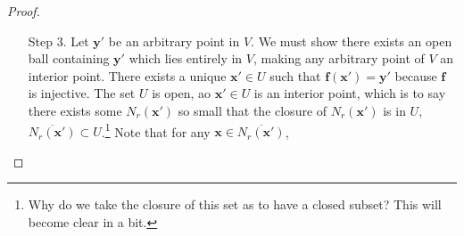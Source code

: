 \documentclass{article}
\newcommand{\R}{\mathbb{R}}
\newcommand{\x}{\mathbf{x}}
\newcommand{\f}{\mathbf{f}}
\newcommand{\y}{\mathbf{y}}
\newcommand{\norm}[1]{\left\lVert#1\right\rVert}
\newcommand{\normop}[1]{\left\lVert#1\right\rVert_\text{op}}
\theoremstyle{definition}
\begin{document}
\begin{proof}
\begin{enumerate}
\begin{align}
	\varphi_\y'(\x) &= I -  [\f'(\x_0)]^{-1} \f(\x)\nonumber\\ 
	& =  [\f'(\x_0)]^{-1}\f'(\x_0) -  [\f'(\x_0)]^{-1} \f(\x)\nonumber\\ 
	& = [\f'(\x_0)]^{-1}\left[\f'(\x_0) - \f(\x)\right].
\end{align}
If we combine this with (51), we have 
\begin{align*}
	\normop{\varphi_\y'(\x)} & = \normop{[\f'(\x_0)]^{-1}\left[\f'(\x_0) - \f(\x)\right]} \\
	& \le \normop{[\f'(\x_0)]^{-1}}\normop{\f'(\x_0) - \f(\x)}& (\text{Lemma 8.2})\\ & 
	< \normop{[\f'(\x_0)]^{-1}}\frac{\normop{[\f'(\x_0)]^{-1}}^{-1}}{2} & (\text{Equation (51)})\\
	& = \frac{1}{2}
\end{align*}
for all $ \x \in U $.\footnote{For all $ \x\in U $, as these are the set of $ \x $ for which $ \norm{\x-\x_0}_{\R^n} < \delta $ and (51) holds.} If we apply Theorem 9.5 to $ \varphi_\y(\x) $ and the bound $ 	\normop{\varphi_\y'(\x)} < \frac{1}{2} $, we have 
\begin{equation}\label{key}
	\norm{\varphi_\y(\x) - \varphi_\y(\x')} \le \frac{1}{2}\norm{\x-\x'}_{\R^n} 
\end{equation}
 for all $ \x,\x'\in U $. This makes $ \varphi_\y(\x) $ a contraction.\footnote{But we cannot use the Banach fixed point theorem yet. We don't know the range of $ \varphi_\y(\x) $.} This does however show that $ \varphi_\y $ has \textit{at most} on fixed point in $ U $.\footnote{Actually, any contraction has at most one fixed point.} For the sake of contradiction, suppose $ \varphi_\y(\x)=\x $ and $ \varphi_\y(\x')=\x'  $. This would contradict (54): 
 $$ \norm{\varphi_\y(\x) - \varphi_\y(\x')} = \norm{\x - \x'} \not\le  \frac{1}{2}\norm{\x-\x'}_{\R^n} .$$
 For all $ \y $, $ \varphi_\y(\x) $ has at most one fixed point. By (52), we have $ \y = \f(\x) $ for at most one $ \x\in U $, making $ \f $ injective on $ U $. We also are given that $ V = \f(U) $, so $ \f $ is also surjective on $ V $ by the definition of $ \f(U) $. If $ \f:U\to V $ is injective and surjective, it is invertible. 
 \item [Step 3.] Let $ \y'$ be an arbitrary point in $ V $. We must show there exists an open ball containing $ \y' $ which lies entirely in  $ V $, making any arbitrary point of $ V $ an interior point.  There exists a unique $ \x'\in U $ such that $ \f(\x')=\y' $ because $ \f $ is injective. The set $ U $ is open, ao $ \x'\in U $ is an interior point, which is to say there exists some $ N_r(\x') $ so small that the closure of $ N_r(\x') $ is in $ U $, $ \overline{N_r(\x')}\subset U $.\footnote{Why do we take the closure of this set as to have a closed subset? This will become clear in a bit.} Note that for any $ \x \in \overline{N_r(\x')} $, 

\end{enumerate}
\end{proof}
\end{document}
